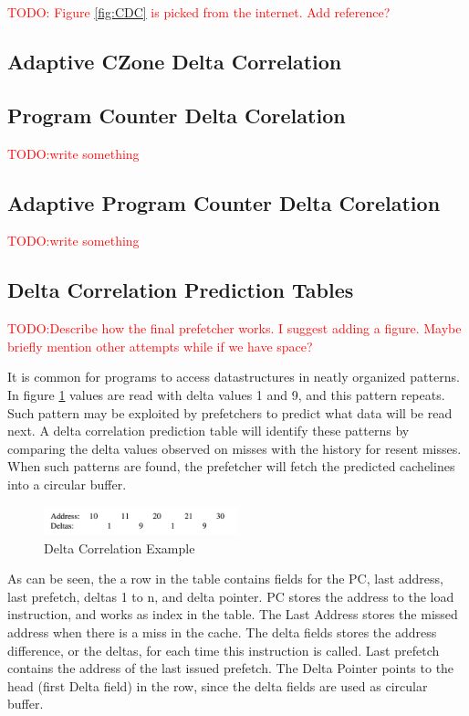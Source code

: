 \documentclass[a4paper]{IEEEtran}
\newcommand\TODO[1]{\textcolor{red}{TODO:#1}}
\newcommand\todo[1]{\TODO{#1}}
\begin{document}
\todo{ Figure \ref{fig:CDC} is picked from the internet. Add reference? }

\subsection{Adaptive CZone Delta Correlation}


\subsection{Program Counter Delta Corelation}
\todo{write something}

\subsection{Adaptive Program Counter Delta Corelation}
\todo{write something}

\subsection{Delta Correlation Prediction Tables}

\todo{Describe how the final prefetcher works. I suggest adding a figure. Maybe briefly mention other attempts while if we have space?}

It is common for programs to access datastructures in neatly organized patterns.
In figure \ref{fig:DCExample} values are read with delta values 1 and 9, and this pattern repeats.
Such pattern may be exploited by prefetchers to predict what data will be read next.
A delta correlation prediction table will identify these patterns by comparing the delta values observed on misses with the history for resent misses.
When such patterns are found, the prefetcher will fetch the predicted cachelines into a circular buffer.


\begin{figure}[h!]
  \centering
      \includegraphics[width=0.5\textwidth]{Figures/DCExample}
  \caption{Delta Correlation Example}
  \label{fig:DCExample}
\end{figure}

As can be seen, the a row in the table contains fields for the PC, last address, last prefetch, deltas 1 to n, and delta pointer.
PC stores the address to the load instruction, and works as index in the table.
The Last Address stores the missed address when there is a miss in the cache.
The delta fields stores the address difference, or the deltas, for each time this instruction is called.
Last prefetch contains the address of the last issued prefetch.
The Delta Pointer points to the head (first Delta field) in the row, since the delta fields are used as circular buffer.
\end{document}
